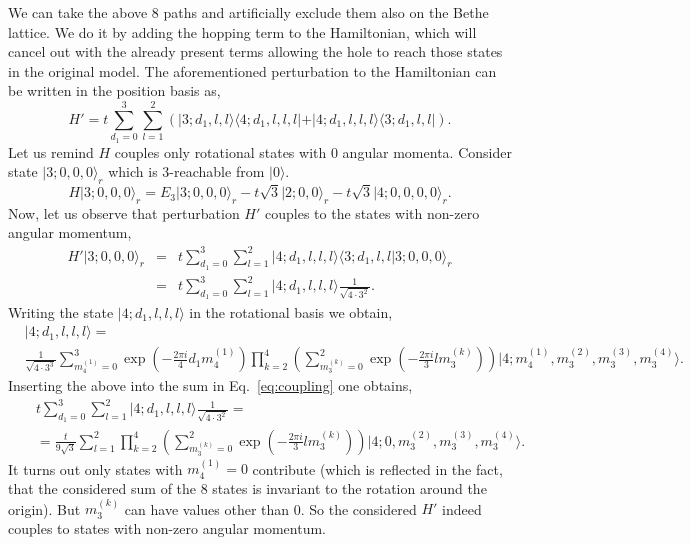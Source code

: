 \documentclass[11pt, a4paper, onecolumn]{article}
\newcommand{\ket}[1]{\vert #1 \rangle}
\newcommand{\bra}[1]{\langle #1 \vert}
\newcommand{\mean}[1]{\langle#1\rangle}
\begin{document}
We can take the above 8 paths and artificially exclude them also on the Bethe lattice. We do it by adding the hopping term to the Hamiltonian, which will cancel out with the already present terms allowing the hole to reach those states in the original model. The aforementioned perturbation to the Hamiltonian can be written in the position basis as,
\begin{equation}
	H' = t \sum_{d_1 = 0}^3 \sum_{l=1}^2 \left(\ket{3;d_1,l,l}\bra{4;d_1,l,l,l} + \ket{4;d_1,l,l,l}\bra{3;d_1,l,l}\right).
\end{equation}
Let us remind $H$ couples only rotational states with 0 angular momenta. Consider state $\ket{3;0,0,0}_r$ which is 3-reachable from $\ket{0}$.
\begin{equation}
	H\ket{3;0,0,0}_r = E_3\ket{3;0,0,0}_r -t\sqrt{3} \ket{2;0,0}_r -t\sqrt{3}\ket{4;0,0,0,0}_r.
\end{equation}
Now, let us observe that perturbation $H'$ couples to the states with non-zero angular momentum, 
\begin{eqnarray}
	H'\ket{3;0,0,0}_r 
	&=& t \sum_{d_1 = 0}^3 \sum_{l=1}^2 \ket{4;d_1,l,l,l}\mean{3;d_1,l,l \vert 3;0,0,0}_r \\
	&=& t \sum_{d_1 = 0}^3 \sum_{l=1}^2 \ket{4;d_1,l,l,l} \frac{1}{\sqrt{4 \cdot 3^2}}. 
	\label{eq:coupling}
\end{eqnarray}
Writing the state $\ket{4;d_1,l,l,l}$ in the rotational basis we obtain,
\begin{equation}
\begin{aligned}
	&\ket{4;d_1,l,l,l} = \\
	&\frac{1}{\sqrt{4 \cdot 3^3}} \sum_{m^{(1)}_4=0}^3 \exp\left(-\frac{2 \pi i}{4}d_1 m^{(1)}_4\right) \prod_{k=2}^4 \left(\sum_{m^{(k)}_3=0}^2  \exp\left(-\frac{2 \pi i}{3}l m^{(k)}_3\right) \right)\ket{4;m^{(1)}_4,m^{(2)}_3,m^{(3)}_3,m^{(4)}_3}.
\end{aligned}
\end{equation}
Inserting the above into the sum in Eq.~\ref{eq:coupling} one obtains,
\begin{eqnarray}
	&&t\sum_{d_1=0}^3 \sum_{l=1}^2 \ket{4;d_1,l,l,l} \frac{1}{\sqrt{4 \cdot 3^2}} = \\
	&&=\frac{t}{9\sqrt{3}} \sum_{l=1}^2 \prod_{k=2}^4 \left(\sum_{m^{(k)}_3=0}^2  \exp\left(-\frac{2 \pi i}{3}l m^{(k)}_3\right) \right)\ket{4;0,m^{(2)}_3,m^{(3)}_3,m^{(4)}_3}.
\end{eqnarray}
It turns out only states with $m^{(1)}_4 = 0$ contribute (which is reflected in the fact, that the considered sum of the 8 states is invariant to the rotation around the origin). But $m^{(k)}_3$ can have values other than 0. So the considered $H'$ indeed couples to states with non-zero angular momentum.
\end{document}
